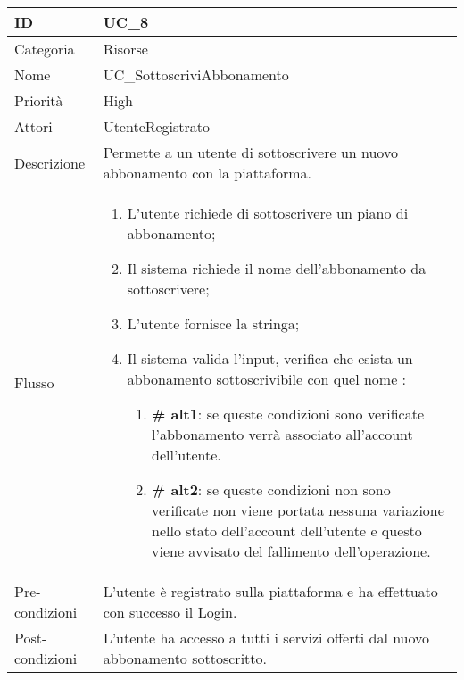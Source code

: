 \begin{center}
\begin{tabular}{ |p{2cm}|p{13cm}|  }
\hline
ID & UC\_8 \\\hline
Categoria & Risorse\\\hline
Nome & UC\_SottoscriviAbbonamento\\\hline
Priorità & High \\\hline
Attori &  UtenteRegistrato \\\hline
Descrizione & Permette a un utente di sottoscrivere un nuovo abbonamento con la piattaforma.\\\hline
Flusso &  	\begin{enumerate}
			\item L'utente richiede di sottoscrivere un piano di abbonamento;
			\item Il sistema richiede il nome dell'abbonamento da sottoscrivere;
			\item L'utente fornisce la stringa;
			\item Il sistema valida l'input, verifica che esista un abbonamento sottoscrivibile con quel nome :
			\begin{enumerate}[  ]
				\item \textbf{\# alt1}: se queste condizioni sono verificate l'abbonamento verrà associato all'account dell'utente.
				\item \textbf{\# alt2}: se queste condizioni non sono verificate non viene portata nessuna variazione nello stato dell'account dell'utente e questo viene avvisato del fallimento dell'operazione.
			\end{enumerate}
		\end{enumerate}\\\hline
Pre-condizioni & L'utente è registrato sulla piattaforma e ha effettuato con successo il Login.\\\hline
Post-condizioni &  L'utente ha accesso a tutti i servizi offerti dal nuovo abbonamento sottoscritto.\\\hline
\end{tabular}
\label{table_use_case:8}\newline


\end{center}
